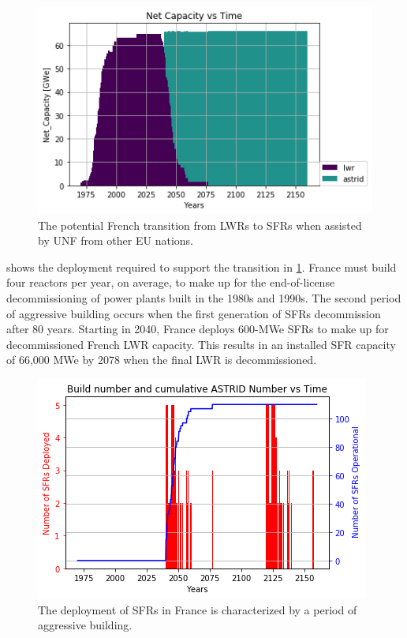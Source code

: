\begin{figure}[htbp!]
        \begin{center}
                \includegraphics[scale=0.6]{./images/french-transition/power_plot.png}
        \end{center}
        \caption{The potential French transition from \glspl{LWR} to 
                \glspl{SFR} when assisted by \gls{UNF} from other \gls{EU} 
        nations.}
        \label{fig:sfr_num}
\end{figure}

 shows the deployment required to support the transition in 
\cref{fig:sfr_num}. France must build four reactors per year, on average, to 
make up for the end-of-license decommissioning of power plants built in the 1980s and 1990s.  The second period of aggressive building occurs when the first generation of \glspl{SFR} decommission after 80 years. Starting in 2040, France deploys 600-\gls{MWe} \glspl{SFR} to make up for 
decommissioned French \gls{LWR} capacity. This results in an installed 
\gls{SFR} 
capacity of 66,000 \gls{MWe} by 2078 when the final \gls{LWR} is 
decommissioned. 



\begin{figure}[htbp!]
    \begin{center}
        \includegraphics[scale=0.6]{./images/french-transition/sfr_deploy.png}
    \end{center}
    \caption{The deployment of \glspl{SFR} in France is characterized by a period of
    aggressive building.}
    \label{fig:dep}
\end{figure}


